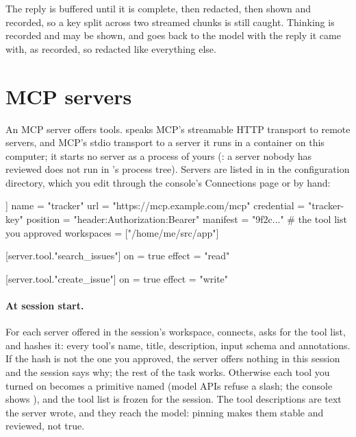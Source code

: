 The reply is buffered until it is complete, then redacted, then shown and
recorded, so a key split across two streamed chunks is still caught. Thinking
is recorded and may be shown, and goes back to the model with the reply it
came with, as recorded, so redacted like everything else.

\section{MCP servers}

An MCP server offers tools. \nodwyn{} speaks MCP's streamable HTTP
transport to remote servers, and MCP's stdio transport to a server it runs
in a container on this computer; it starts no server as a process of yours
(: a server nobody has reviewed does not run in \nodwyn's process
tree). Servers are listed in  in the configuration
directory, which you edit through the console's Connections page or by
hand:

\begin{txt}
[[server]]
name = "tracker"
url = "https://mcp.example.com/mcp"
credential = "tracker-key"
position = "header:Authorization:Bearer"
manifest = "9f2c..."                  # the tool list you approved
workspaces = ["/home/me/src/app"]

[server.tool."search_issues"]
on = true
effect = "read"

[server.tool."create_issue"]
on = true
effect = "write"
\end{txt}

\paragraph{At session start.} For each server offered in the session's
workspace, \nodwyn{} connects, asks for the tool list, and hashes it: every
tool's name, title, description, input schema and annotations. If the hash
is not the one you approved, the server offers nothing in this session and
the session says why; the rest of the task works. Otherwise each tool you
turned on becomes a primitive named  (model APIs refuse
a slash; the console shows ), and the tool list is frozen
for the session. The tool descriptions are text the server wrote, and they
reach the model: pinning makes them stable and reviewed, not true.

